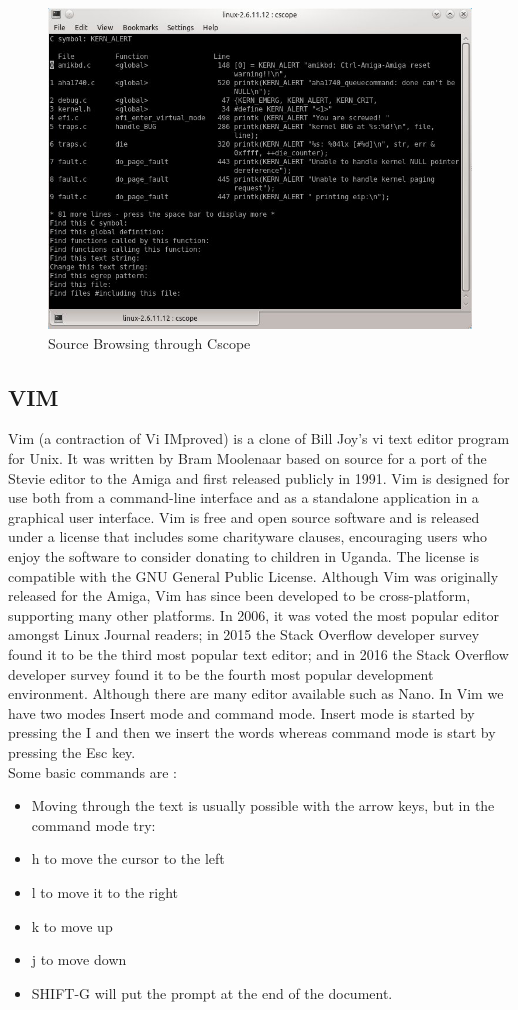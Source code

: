 \begin{figure}[ht]
	\centering
	\includegraphics[scale=0.8]{images/cscope.png}
	\caption{Source Browsing through Cscope}
\end{figure}
\subsection{VIM}
Vim (a contraction of Vi IMproved) is a clone of Bill Joy's vi text editor program for Unix. It was written by Bram Moolenaar based on source for a port of the Stevie editor to the Amiga and first released publicly in 1991. Vim is designed for use both from a command-line interface and as a standalone application in a graphical user interface. Vim is free and open source software and is released under a license that includes some charityware clauses, encouraging users who enjoy the software to consider donating to children in Uganda. The license is compatible with the GNU General Public License. Although Vim was originally released for the Amiga, Vim has since been developed to be cross-platform, supporting many other platforms. In 2006, it was voted the most popular editor amongst Linux Journal readers; in 2015 the Stack Overflow developer survey found it to be the third most popular text editor; and in 2016 the Stack Overflow developer survey found it to be the fourth most popular development environment. Although there are many editor available such as Nano. In Vim we have two modes Insert mode and command mode. Insert mode is started by pressing the I and then we insert the words whereas command mode is start by pressing the Esc key.\\
Some basic commands are :
\begin{itemize}
	\item Moving through the text is usually possible with the arrow keys, but in the command mode try:
	\item h to move the cursor to the left
	\item l to move it to the right
	\item k to move up
	\item j to move down
	\item SHIFT-G will put the prompt at the end of the document.
\end{itemize}
